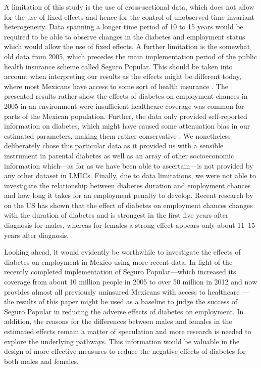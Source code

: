 A limitation of this study is the use of cross-sectional
data, which does not allow for the use of fixed effects and hence
for the control of unobserved time-invariant heterogeneity. Data spanning
a longer time period of 10 to 15 years would be required to be able
to observe changes in the diabetes and employment status which would
allow the use of fixed effects. A further limitation is the somewhat
old data from 2005, which precedes the main implementation period
of the public health insurance scheme called Seguro Popular. This
should be taken into account when interpreting our results as the
effects might be different today, where most Mexicans have access
to some sort of health insurance \parencite{Knaul2012}. The presented
results rather show the effects of diabetes on employment chances
in 2005 in an environment were insufficient healthcare coverage was
common for parts of the Mexican population. Further, the data only
provided self-reported information on diabetes, which might have caused
some attenuation bias in our estimated parameters, making them rather
conservative \parencite{Lewbel2007}. We nonetheless deliberately chose
this particular data as it provided us with a sensible instrument
in parental diabetes as well as an array of other socioeconomic information
which---as far as we have been able to ascertain---is not provided
by any other dataset in \acp{LMIC}. Finally, due to data limitations,
we were not able to investigate the relationship between diabetes
duration and employment chances and how long it takes for an employment
penalty to develop. Recent research by \textcite{Minor2013} on the US
has shown that the effect of diabetes on employment chances changes
with the duration of diabetes and is strongest in the first five years
after diagnosis for males, whereas for females a strong effect appears
only about 11--15 years after diagnosis.

Looking ahead, it would evidently be worthwhile to investigate
the effects of diabetes on employment in Mexico using more recent
data. In light of the recently completed implementation of  Seguro
Popular---which increased its coverage from about 10 million people
in 2005 to over 50 million in 2012 and now provides almost all previously
uninsured Mexicans with access to healthcare \parencite{Knaul2012} ---
the results of this paper might be used as a baseline to judge the
success of Seguro Popular in reducing the adverse effects of diabetes
on employment. In addition, the reasons for the differences between
males and females in the estimated effects remain a matter of speculation
and more research is needed to explore the underlying pathways. This
information would be valuable in the design of more effective measures
to reduce the negative effects of diabetes for both males and females.

